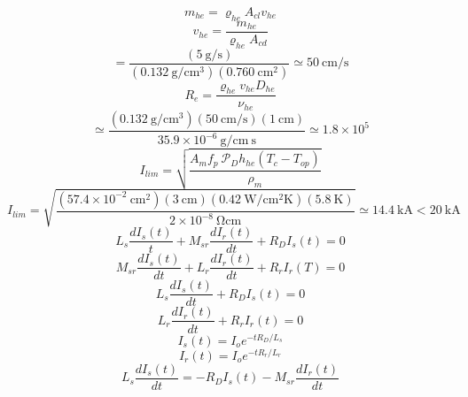 \begin{equation}%
m_{he}=\varrho_{he}A_{cl}v_{he}
\end{equation}
\begin{equation}%
v_{he}=\frac{m_{he}}{\varrho_{he}A_{cd}}
\end{equation}
\begin{equation}%
=\frac{(5\ \mathrm{g/s})}{(0.132\ \mathrm{g/cm^3})(0.760\ \mathrm{cm^2})}\simeq50\ \mathrm{cm/s}
\end{equation}
\begin{equation}%
R_e=\frac{\varrho_{he}v_{he}D_{he}}{\nu_{he}}
\end{equation}
\begin{equation}%
\simeq\frac{(0.132\ \mathrm{g/cm^3})(50\ \mathrm{cm/s})(1\ \mathrm{cm})}{35.9\times10^{-6}\ \mathrm{g/cm\ s}}\simeq1.8\times10^5
\end{equation}
\begin{equation}%
I_{lim}=\sqrt{\frac{A_mf_p\ \mathcal{P}_Dh_{he}(T_c-T_{op})}{\rho_m}}
\end{equation}
\begin{equation}%
I_{lim}=\sqrt{\frac{(57.4\times10^{-2}\ \mathrm{cm^2})(3\ \mathrm{cm})(0.42\ \mathrm{W/cm^2K})(5.8\ \mathrm{K})}{2\times10^{-8}\ \mathrm{\Omega cm}}}\simeq 14.4\ \mathrm{kA}<20\ \mathrm{kA}
\end{equation}
\begin{equation}%
L_s\frac{dI_s(t)}{t}+M_{sr}\frac{dI_r(t)}{dt}+R_DI_s(t)=0
\end{equation}
\begin{equation}%
M_{sr}\frac{dI_s(t)}{dt}+L_r\frac{dI_r(t)}{dt}+R_rI_r(T)=0
\end{equation}
\begin{equation}%
L_s\frac{dI_s(t)}{dt}+R_DI_s(t)=0
\end{equation}
\begin{equation}%
L_r\frac{dI_r(t)}{dt}+R_rI_r(t)=0
\end{equation}
\begin{equation}%
I_s(t)=I_oe^{-tR_D/L_s}
\end{equation}
\begin{equation}%
I_r(t)=I_oe^{-tR_r/L_r}
\end{equation}
\begin{equation}%
L_s\frac{dI_s(t)}{dt}=-R_DI_s(t)-M_{sr}\frac{dI_r(t)}{dt}
\end{equation}
